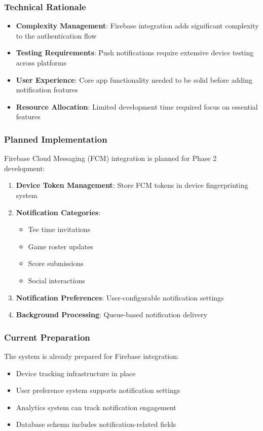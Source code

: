 \documentclass[12pt,a4paper]{article}
\begin{document}
\subsubsection{Technical Rationale}
\begin{itemize}
    \item \textbf{Complexity Management}: Firebase integration adds significant complexity to the authentication flow
    \item \textbf{Testing Requirements}: Push notifications require extensive device testing across platforms
    \item \textbf{User Experience}: Core app functionality needed to be solid before adding notification features
    \item \textbf{Resource Allocation}: Limited development time required focus on essential features
\end{itemize}

\subsubsection{Planned Implementation}
Firebase Cloud Messaging (FCM) integration is planned for Phase 2 development:

\begin{enumerate}
    \item \textbf{Device Token Management}: Store FCM tokens in device fingerprinting system
    \item \textbf{Notification Categories}: 
    \begin{itemize}
        \item Tee time invitations
        \item Game roster updates
        \item Score submissions
        \item Social interactions
    \end{itemize}
    \item \textbf{Notification Preferences}: User-configurable notification settings
    \item \textbf{Background Processing}: Queue-based notification delivery
\end{enumerate}

\subsubsection{Current Preparation}
The system is already prepared for Firebase integration:

\begin{itemize}
    \item Device tracking infrastructure in place
    \item User preference system supports notification settings
    \item Analytics system can track notification engagement
    \item Database schema includes notification-related fields
\end{itemize}
\end{document}
